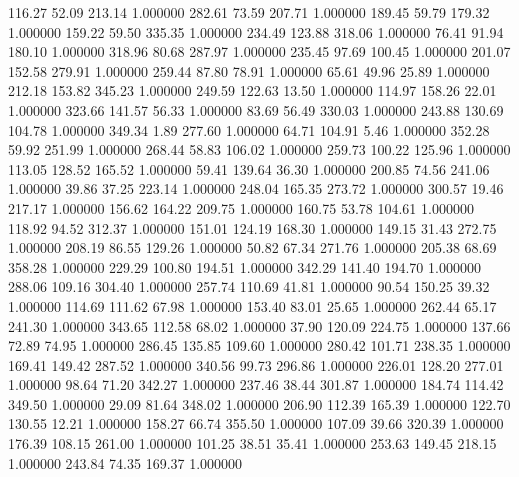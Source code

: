     116.27     52.09    213.14  1.000000
    282.61     73.59    207.71  1.000000
    189.45     59.79    179.32  1.000000
    159.22     59.50    335.35  1.000000
    234.49    123.88    318.06  1.000000
     76.41     91.94    180.10  1.000000
    318.96     80.68    287.97  1.000000
    235.45     97.69    100.45  1.000000
    201.07    152.58    279.91  1.000000
    259.44     87.80     78.91  1.000000
     65.61     49.96     25.89  1.000000
    212.18    153.82    345.23  1.000000
    249.59    122.63     13.50  1.000000
    114.97    158.26     22.01  1.000000
    323.66    141.57     56.33  1.000000
     83.69     56.49    330.03  1.000000
    243.88    130.69    104.78  1.000000
    349.34      1.89    277.60  1.000000
     64.71    104.91      5.46  1.000000
    352.28     59.92    251.99  1.000000
    268.44     58.83    106.02  1.000000
    259.73    100.22    125.96  1.000000
    113.05    128.52    165.52  1.000000
     59.41    139.64     36.30  1.000000
    200.85     74.56    241.06  1.000000
     39.86     37.25    223.14  1.000000
    248.04    165.35    273.72  1.000000
    300.57     19.46    217.17  1.000000
    156.62    164.22    209.75  1.000000
    160.75     53.78    104.61  1.000000
    118.92     94.52    312.37  1.000000
    151.01    124.19    168.30  1.000000
    149.15     31.43    272.75  1.000000
    208.19     86.55    129.26  1.000000
     50.82     67.34    271.76  1.000000
    205.38     68.69    358.28  1.000000
    229.29    100.80    194.51  1.000000
    342.29    141.40    194.70  1.000000
    288.06    109.16    304.40  1.000000
    257.74    110.69     41.81  1.000000
     90.54    150.25     39.32  1.000000
    114.69    111.62     67.98  1.000000
    153.40     83.01     25.65  1.000000
    262.44     65.17    241.30  1.000000
    343.65    112.58     68.02  1.000000
     37.90    120.09    224.75  1.000000
    137.66     72.89     74.95  1.000000
    286.45    135.85    109.60  1.000000
    280.42    101.71    238.35  1.000000
    169.41    149.42    287.52  1.000000
    340.56     99.73    296.86  1.000000
    226.01    128.20    277.01  1.000000
     98.64     71.20    342.27  1.000000
    237.46     38.44    301.87  1.000000
    184.74    114.42    349.50  1.000000
     29.09     81.64    348.02  1.000000
    206.90    112.39    165.39  1.000000
    122.70    130.55     12.21  1.000000
    158.27     66.74    355.50  1.000000
    107.09     39.66    320.39  1.000000
    176.39    108.15    261.00  1.000000
    101.25     38.51     35.41  1.000000
    253.63    149.45    218.15  1.000000
    243.84     74.35    169.37  1.000000
